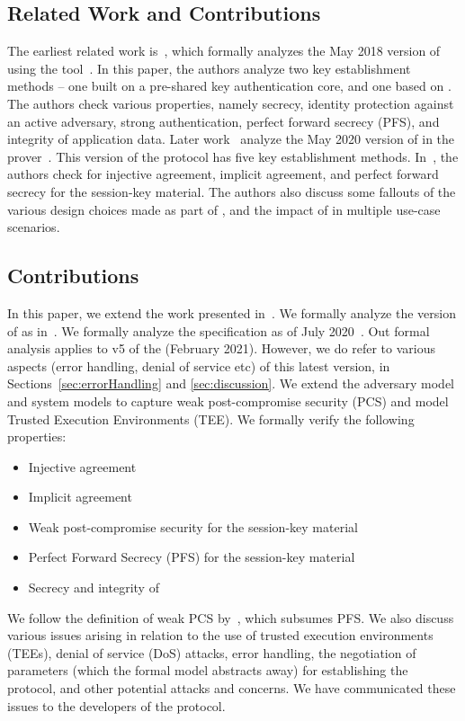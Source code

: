 \subsection{Related Work and Contributions}
\label{sub:related}
The earliest related work is~\cite{DBLP:conf/secsr/BruniJPS18}, which formally
analyzes the May 2018 version of \mEdhoc{} using the \mProverif{}
tool~\cite{DBLP:conf/csfw/Blanchet01}.
%
In this paper, the authors analyze two key establishment methods -- one built
on
a pre-shared key authentication core, and one based on \mSigma{}.
%
The authors check  various properties, namely secrecy, identity protection
against an active adversary, strong authentication, perfect forward secrecy
(PFS), and integrity of application data.
%
Later work~\cite{Norr21} analyze the May 2020 version of \mEdhoc{} in the
\mTamarin{} prover~\cite{DBLP:conf/cav/MeierSCB13}.
%
This version of the protocol has five key establishment methods.
%
In~\cite{Norr21}, the authors check for injective agreement, implicit
agreement, and perfect forward secrecy for the session-key material.
%
The authors also discuss some fallouts of the various design choices made as
part of \mEdhoc{}, and the impact of \mEdhoc{} in multiple use-case scenarios.

\subsection{Contributions}
\label{sec:contributions}
In this paper, we extend the work presented in~\cite{Norr21}.
%
We formally analyze the version of \mEdhoc{} as in~\cite{}.
%
We formally analyze the \mEdhoc{} specification as of July
2020~\cite{our-analysis-selander-lake-edhoc-00}.
%
Out formal analysis applies to v5 of the \mSpec{} (February 2021).
%
However, we do refer to various aspects
(error handling, denial of service etc) of this latest version,
in Sections~\ref{sec:errorHandling} and \ref{sec:discussion}.
We extend the adversary model and \mTamarin{} system models to capture weak
post-compromise security (PCS) and model Trusted Execution Environments
(TEE).
%
We formally verify the following properties:
\begin{itemize}
\item Injective agreement
\item Implicit agreement
\item Weak post-compromise security for the session-key material
\item Perfect Forward Secrecy (PFS) for the session-key material
\item Secrecy and integrity of \mADthree
\end{itemize}
%
We follow the definition of weak PCS by~\cite{DBLP:conf/csfw/Cohn-GordonCG16},
which subsumes PFS.
%
We also discuss various issues arising in relation to the use of trusted
execution environments (TEEs), denial of service (DoS) attacks, error handling,
the negotiation of parameters (which the formal model abstracts
away) for establishing the protocol, and other potential attacks and concerns.
%
We have communicated these issues to the developers of the protocol.
%

